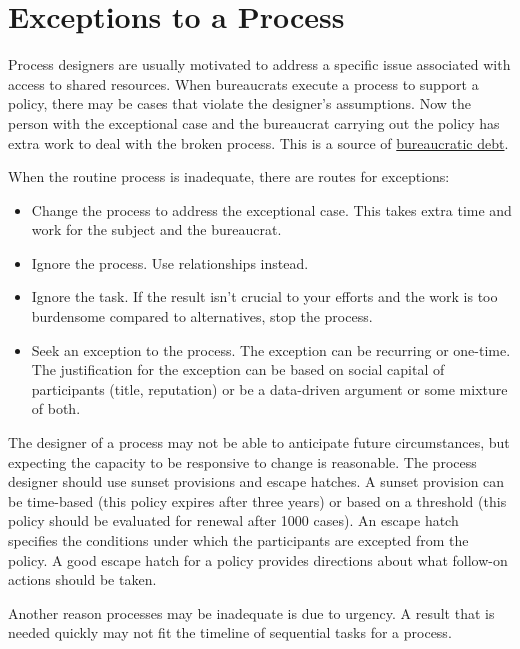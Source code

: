 \section{Exceptions to a Process\label{sec:exceptions-to-process}}


Process designers are usually motivated to address a specific issue associated with access to shared resources. When bureaucrats execute a process to support a policy, there may be cases that violate the designer's assumptions. Now the person with the exceptional case and the bureaucrat carrying out the policy has extra work to deal with the broken process. This is a source of \hyperref[sec:bureaucratic-debt]{bureaucratic debt}. 

When the routine process is inadequate, there are routes for exceptions:
\begin{itemize}
    \item Change the process to address the exceptional case. This takes extra time and work for the subject and the bureaucrat.
    \item Ignore the process. Use relationships instead.
    \item Ignore the task. If the result isn't crucial to your efforts and the work is too burdensome compared to alternatives, stop the process.
    \item Seek an exception to the process. The exception can be recurring or one-time. The justification for the exception can be based on social capital of participants (title, reputation) or be a data-driven argument or some mixture of both.
\end{itemize}

The designer of a process may not be able to anticipate future circumstances, but expecting the capacity to be responsive to change is reasonable. The process designer should use sunset provisions and escape hatches.  
A sunset provision can be time-based (this policy expires after three years) or based on a threshold (this policy should be evaluated for renewal after 1000 cases). An escape hatch specifies the conditions under which the participants are excepted from the policy. A good escape hatch for a policy provides directions about what follow-on actions should be taken.

Another reason processes may be inadequate is due to urgency. A result that is needed quickly may not fit the timeline of sequential tasks for a process.


